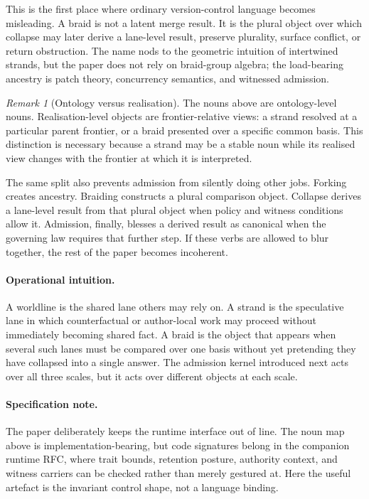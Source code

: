 \documentclass[11pt]{article}
\theoremstyle{definition}
\theoremstyle{plain}
\theoremstyle{remark}
\newtheorem{remark}[definition]{Remark}
\begin{document}
This is the first place where ordinary version-control language becomes misleading. A braid is not a latent merge result. It is the plural object over which collapse may later derive a lane-level result, preserve plurality, surface conflict, or return obstruction. The name nods to the geometric intuition of intertwined strands, but the paper does not rely on braid-group algebra; the load-bearing ancestry is patch theory, concurrency semantics, and witnessed admission.

\begin{remark}[Ontology versus realisation]
The nouns above are ontology-level nouns. Realisation-level objects are frontier-relative views: a strand resolved at a particular parent frontier, or a braid presented over a specific common basis. This distinction is necessary because a strand may be a stable noun while its realised view changes with the frontier at which it is interpreted.
\end{remark}

The same split also prevents admission from silently doing other jobs. Forking creates ancestry. Braiding constructs a plural comparison object. Collapse derives a lane-level result from that plural object when policy and witness conditions allow it. Admission, finally, blesses a derived result as canonical when the governing law requires that further step. If these verbs are allowed to blur together, the rest of the paper becomes incoherent.

\paragraph{Operational intuition.}
A worldline is the shared lane others may rely on. A strand is the speculative lane in which counterfactual or author-local work may proceed without immediately becoming shared fact. A braid is the object that appears when several such lanes must be compared over one basis without yet pretending they have collapsed into a single answer. The admission kernel introduced next acts over all three scales, but it acts over different objects at each scale.

\paragraph{Specification note.}
The paper deliberately keeps the runtime interface out of line. The noun map above is implementation-bearing, but code signatures belong in the companion runtime RFC, where trait bounds, retention posture, authority context, and witness carriers can be checked rather than merely gestured at. Here the useful artefact is the invariant control shape, not a language binding.
\end{document}
